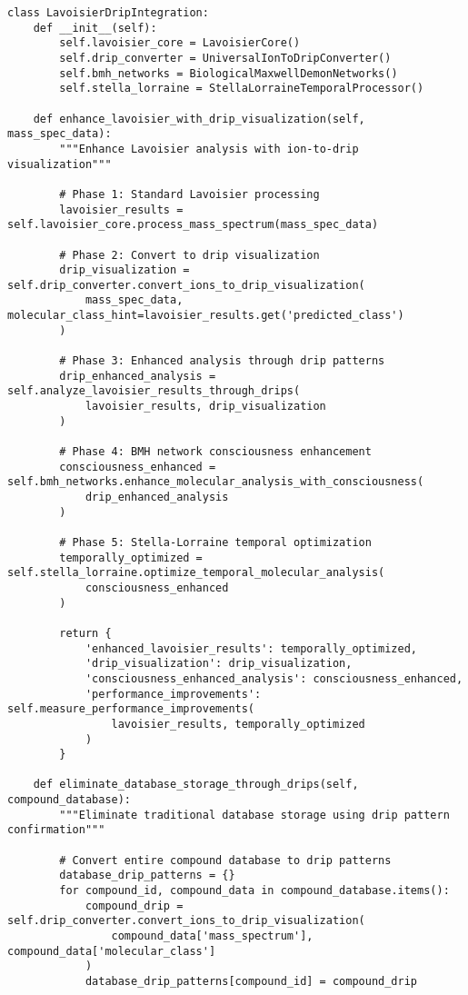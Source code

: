 \documentclass[12pt,a4paper]{article}
\begin{document}
\begin{lstlisting}[style=pythonstyle, caption=Lavoisier Integration with Ion-to-Drip Framework]
class LavoisierDripIntegration:
    def __init__(self):
        self.lavoisier_core = LavoisierCore()
        self.drip_converter = UniversalIonToDripConverter()
        self.bmh_networks = BiologicalMaxwellDemonNetworks()
        self.stella_lorraine = StellaLorraineTemporalProcessor()
        
    def enhance_lavoisier_with_drip_visualization(self, mass_spec_data):
        """Enhance Lavoisier analysis with ion-to-drip visualization"""
        
        # Phase 1: Standard Lavoisier processing
        lavoisier_results = self.lavoisier_core.process_mass_spectrum(mass_spec_data)
        
        # Phase 2: Convert to drip visualization
        drip_visualization = self.drip_converter.convert_ions_to_drip_visualization(
            mass_spec_data, molecular_class_hint=lavoisier_results.get('predicted_class')
        )
        
        # Phase 3: Enhanced analysis through drip patterns
        drip_enhanced_analysis = self.analyze_lavoisier_results_through_drips(
            lavoisier_results, drip_visualization
        )
        
        # Phase 4: BMH network consciousness enhancement
        consciousness_enhanced = self.bmh_networks.enhance_molecular_analysis_with_consciousness(
            drip_enhanced_analysis
        )
        
        # Phase 5: Stella-Lorraine temporal optimization
        temporally_optimized = self.stella_lorraine.optimize_temporal_molecular_analysis(
            consciousness_enhanced
        )
        
        return {
            'enhanced_lavoisier_results': temporally_optimized,
            'drip_visualization': drip_visualization,
            'consciousness_enhanced_analysis': consciousness_enhanced,
            'performance_improvements': self.measure_performance_improvements(
                lavoisier_results, temporally_optimized
            )
        }
    
    def eliminate_database_storage_through_drips(self, compound_database):
        """Eliminate traditional database storage using drip pattern confirmation"""
        
        # Convert entire compound database to drip patterns
        database_drip_patterns = {}
        for compound_id, compound_data in compound_database.items():
            compound_drip = self.drip_converter.convert_ions_to_drip_visualization(
                compound_data['mass_spectrum'], compound_data['molecular_class']
            )
            database_drip_patterns[compound_id] = compound_drip
        

\end{lstlisting}
\end{document}
